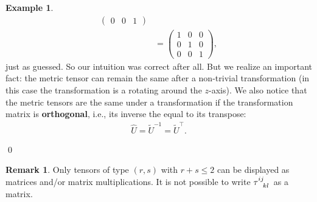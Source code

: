 \documentclass{book}
\theoremstyle{definition}
\newtheorem{rmk}{Remark}[section]
\newtheorem{exmp}{Example}[section]
\begin{document}
\begin{exmp}
\begin{align*}
\begin{pmatrix}
	0 & 0 & 1
	\end{pmatrix}\\
	&=
	\begin{pmatrix}
	1 & 0 & 0\\
	0 & 1 & 0\\
	0 & 0 & 1
	\end{pmatrix},
	\end{align*}
	just as guessed. So our intuition was correct after all. But we realize an important fact: the metric tensor can remain the same after a non-trivial transformation (in this case the transformation is a rotating around the $z$-axis). We also notice that the metric tensors are the same under a transformation if the transformation matrix is \textbf{orthogonal}, i.e., its inverse the equal to its transpose:
	\begin{align*}
	\hat{U} = \tilde{U}^{-1} = \tilde{U}^\top.
	\end{align*}
\end{exmp}\qed

\begin{rmk}
	Only tensors of type $(r,s)$ with $r+s \leq 2$ can be displayed as matrices and/or matrix multiplications. It is not possible to write $\tensor{\tau}{^{ij}_{kl}}$ as a matrix. 
\end{rmk}
\end{document}
